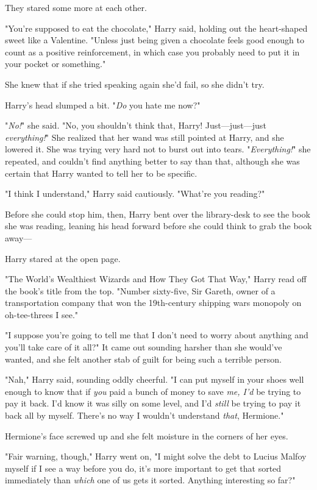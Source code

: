 They stared some more at each other.

"You're supposed to eat the chocolate," Harry said, holding out the
heart-shaped sweet like a Valentine. "Unless just being given a chocolate feels
good enough to count as a positive reinforcement, in which case you probably
need to put it in your pocket or something."

She knew that if she tried speaking again she'd fail, so she didn't try.

Harry's head slumped a bit. "\emph{Do} you hate me now?"

"\emph{No!}" she said. "No, you shouldn't think that, Harry! Just---just---just
\emph{everything!}" She realized that her wand was still pointed at Harry, and
she lowered it. She was trying very hard not to burst out into tears.
"\emph{Everything!}" she repeated, and couldn't find anything better to say than
that, although she was certain that Harry wanted to tell her to be specific.

"I think I understand," Harry said cautiously. "What're you reading?"

Before she could stop him, then, Harry bent over the library-desk to see the
book she was reading, leaning his head forward before she could think to grab
the book away---

Harry stared at the open page.

"The World's Wealthiest Wizards and How They Got That Way," Harry read off the
book's title from the top. "Number sixty-five, Sir Gareth, owner of a
transportation company that won the 19th-century shipping wars{\el} monopoly
on oh-tee-threes{\el} I see."

"I suppose you're going to tell me that I don't need to worry about anything and
you'll take care of it all?" It came out sounding harsher than she would've
wanted, and she felt another stab of guilt for being such a terrible person.

"Nah," Harry said, sounding oddly cheerful. "I can put myself in your shoes
well enough to know that if \emph{you} paid a bunch of money to save \emph{me,
I'd} be trying to pay it back. I'd know it was silly on some level, and I'd
\emph{still} be trying to pay it back all by myself. There's no way I wouldn't
understand \emph{that}, Hermione."

Hermione's face screwed up and she felt moisture in the corners of her eyes.

"Fair warning, though," Harry went on, "I might solve the debt to Lucius Malfoy
myself if I see a way before you do, it's more important to get that sorted
immediately than \emph{which} one of us gets it sorted. Anything interesting so
far?"

